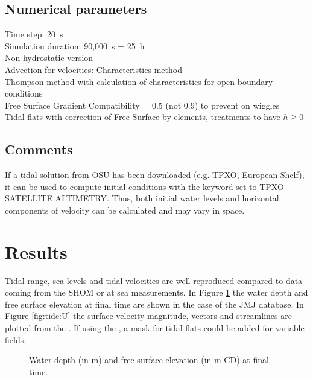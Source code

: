 \subsection{Numerical parameters}

Time step: 20~s\\
Simulation duration: 90,000~s = 25~h\\

Non-hydrostatic version\\
Advection for velocities: Characteristics method\\
Thompson method with calculation of characteristics for open boundary
conditions\\
Free Surface Gradient Compatibility = 0.5 (not 0.9) to prevent on
wiggles\\
Tidal flats with correction of Free Surface by elements, treatments
to have $h \ge 0$

\subsection{Comments}

If a tidal solution from OSU has been downloaded (e.g. TPXO, European
Shelf), it can be used to compute initial conditions with the keyword
 set to TPXO SATELLITE ALTIMETRY.
Thus, both initial water levels and horizontal components of velocity
can be calculated and may vary in space.

\section{Results}

Tidal range, sea levels and tidal velocities are well reproduced compared to
data coming from the SHOM or at sea measurements.
In Figure \ref{fig:tide:H} the water depth and free surface elevation at final
time are shown in the case of the JMJ database.
In Figure \ref{fig:tide:U} the surface velocity magnitude, vectors and
streamlines are plotted from the .
If using the , a mask for tidal flats could be added
for variable fields.

\begin{figure}[!htbp]
\begin{minipage}[t]{0.5\textwidth}
 \centering
\end{minipage}%
\begin{minipage}[t]{0.5\textwidth}
 \centering
\end{minipage}
  \caption{Water depth (in m) and free surface elevation (in m CD) at final time.}\label{fig:tide:H}
\end{figure}


